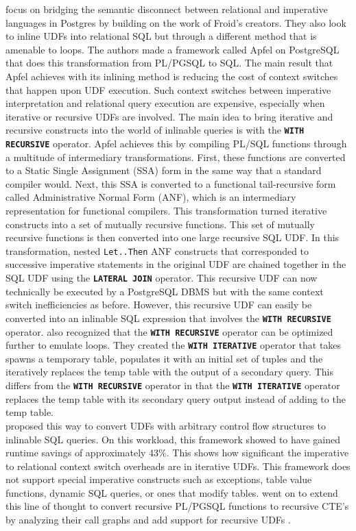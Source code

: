 \documentclass[12pt]{cmuthesis}
\newcommand{\dbSQL}[1]{\texttt{\textbf{#1}}\xspace}
\newcommand{\dbmsPostgres}{PostgreSQL\xspace}
\begin{document}
        \citeauthor{duta19} \cite{duta19} focus on bridging the semantic disconnect between relational and imperative languages in Postgres by building on the work of Froid's creators. They also look to inline UDFs into relational SQL but through a different method that is amenable to loops. The authors made a framework called Apfel on \dbmsPostgres that does this transformation from PL/PGSQL to SQL. The main result that Apfel achieves with its inlining method is reducing the cost of context switches that happen upon UDF execution. Such context switches between imperative interpretation and relational query execution are expensive, especially when iterative or recursive UDFs are involved. The main idea to bring iterative and recursive constructs into the world of inlinable queries is with the \dbSQL{WITH RECURSIVE} operator. Apfel achieves this by compiling PL/SQL functions through a multitude of intermediary transformations. First, these functions are converted to a Static Single Assignment (SSA) form in the same way that a standard compiler would. Next, this SSA is converted to a functional tail-recursive form called Administrative Normal Form (ANF), which is an intermediary representation for functional compilers. This transformation turned iterative constructs into a set of mutually recursive functions. This set of mutually recursive functions is then converted into one large recursive SQL UDF. In this transformation, nested \texttt{Let..Then} ANF constructs that corresponded to successive imperative statements in the original UDF are chained together in the SQL UDF using the \dbSQL{LATERAL JOIN} operator. This recursive UDF can now technically be executed by a \dbmsPostgres DBMS but with the same context switch inefficiencies as before. However, this recursive UDF can easily be converted into an inlinable SQL expression that involves the \dbSQL{WITH RECURSIVE} operator. \citeauthor{duta19} also recognized that the \dbSQL{WITH RECURSIVE} operator can be optimized further to emulate loops. They created the \dbSQL{WITH ITERATIVE} operator that takes spawns a temporary table, populates it with an initial set of tuples and the iteratively replaces the temp table with the output of a secondary query. This differs from the \dbSQL{WITH RECURSIVE} operator in that the \dbSQL{WITH ITERATIVE} operator replaces the temp table with its secondary query output instead of adding to the temp table.\\
        
        \citeauthor{duta19} proposed this way to convert UDFs with arbitrary control flow structures to inlinable SQL queries. On this workload, this framework showed to have gained runtime savings of approximately 43\%. This shows how significant the imperative to relational context switch overheads are in iterative UDFs. This framework does not support special imperative constructs such as exceptions, table value functions, dynamic SQL queries, or ones that modify tables. \citeauthor{duta20} went on to extend this line of thought to convert recursive PL/PGSQL functions to recursive CTE's by analyzing their call graphs and add support for recursive UDFs \cite{duta20}.\\
\end{document}
